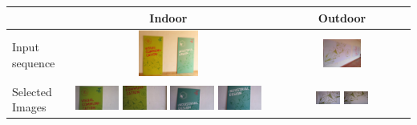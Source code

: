 \begin{table}
\begin{tabular}{l|cc}
\hline 
 & Indoor &  Outdoor \\
\hline 
 Input sequence &
 \includegraphics[width=0.3\textwidth]{figures/idc_indoor/groundtruth.jpg} &
 \includegraphics[width=0.3\textwidth]{figures/green_red/groundtruth.jpg} \\
\hline
 Selected Images & 	\includegraphics[width=0.22\textwidth]{figures/idc_indoor/selected/1.jpg}
\includegraphics[width=0.22\textwidth]{figures/idc_indoor/selected/2.jpg}
\includegraphics[width=0.22\textwidth]{figures/idc_indoor/selected/3.jpg}
\includegraphics[width=0.22\textwidth]{figures/idc_indoor/selected/4.jpg}
& \includegraphics[width=0.19\textwidth]{figures/green_red/selected/1.jpg}
\includegraphics[width=0.19\textwidth]{figures/green_red/selected/2.jpg}

\end{tabular}
\end{table}
